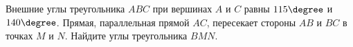 \begin{ex}
	\begin{condition}
		Внешние углы треугольника \( ABC  \) при вершинах \( A  \) и \( C  \) равны \( 115\degree  \) и \( 140\degree \). Прямая, параллельная прямой \( AC \), пересекает стороны \( AB  \) и \( BC  \) в точках \( M  \) и \( N  \). Найдите углы треугольника \( BMN  \).
	\end{condition}
\end{ex}